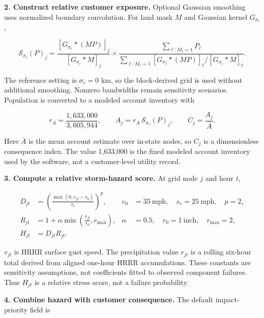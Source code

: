 \documentclass[11pt]{article}
\begin{document}
\textbf{2. Construct relative customer exposure.}
Optional Gaussian smoothing uses normalized boundary convolution. For land mask $M$ and Gaussian kernel $G_{\sigma_c}$,

\begin{equation}
  \mathcal{S}_{\sigma_c}(P)_j=
  \frac{[G_{\sigma_c}*(MP)]_j}{[G_{\sigma_c}*M]_j}
  \times
  \frac{\sum_{\ell:M_\ell=1}P_\ell}
       {\sum_{\ell:M_\ell=1}[G_{\sigma_c}*(MP)]_\ell/[G_{\sigma_c}*M]_\ell}.
  \label{eq:smoothing}
\end{equation}

The reference setting is $\sigma_c=0$ km, so the block-derived grid is used without additional smoothing. Nonzero bandwidths remain sensitivity scenarios. Population is converted to a modeled account inventory with

\begin{equation}
  r_A=\frac{1{,}633{,}000}{3{,}605{,}944},
  \qquad
  A_j=r_A\,\mathcal{S}_{\sigma_c}(P)_j,
  \qquad
  C_j=\frac{A_j}{\overline A}.
  \label{eq:accounts-consequence}
\end{equation}

Here $\overline A$ is the mean account estimate over in-state nodes, so $C_j$ is a dimensionless consequence index. The value 1,633,000 is the fixed modeled account inventory used by the software, not a customer-level utility record.

\textbf{3. Compute a relative storm-hazard score.}
At grid node $j$ and hour $t$,

\begin{align}
  D_{jt}
    &=\left(\frac{\max(0,v_{jt}-v_0)}{s_v}\right)^p,
    &v_0&=35\ \text{mph},\quad s_v=25\ \text{mph},\quad p=2,
    \label{eq:wind}\\
  R_{jt}
    &=1+\alpha\min\left(\frac{r_{jt}}{r_0},r_{\max}\right),
    &\alpha&=0.5,\quad r_0=1\ \text{inch},\quad r_{\max}=2,
    \label{eq:rain}\\
  H_{jt}&=D_{jt}R_{jt}.
  \label{eq:hazard}
\end{align}

$v_{jt}$ is HRRR surface gust speed. The precipitation value $r_{jt}$ is a rolling six-hour total derived from aligned one-hour HRRR accumulations. These constants are sensitivity assumptions, not coefficients fitted to observed component failures. Thus $H_{jt}$ is a relative stress score, not a failure probability.

\textbf{4. Combine hazard with customer consequence.}
The default impact-priority field is
\end{document}
